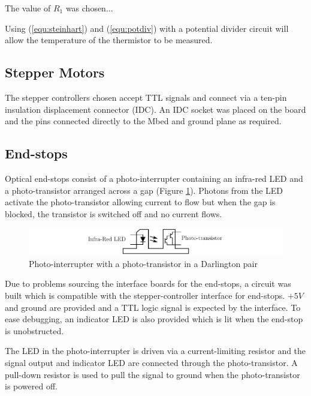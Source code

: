 			
			The value of $R_1$ was chosen...
			
			Using (\ref{equ:steinhart}) and (\ref{equ:potdiv}) with a potential
			divider circuit will allow the temperature of the thermistor to be
			measured.
			
		
		\subsection{Stepper Motors}
			
			The stepper controllers chosen accept TTL signals and connect via a
			ten-pin insulation displacement connector (IDC). An IDC socket was
			placed on the board and the pins connected directly to the Mbed and
			ground plane as required.
			
		
		\subsection{End-stops}
			
			Optical end-stops consist of a photo-interrupter containing an infra-red
			LED and a photo-transistor arranged across a gap (Figure
			\ref{fig:endstop}). Photons from the LED activate the photo-transistor
			allowing current to flow but when the gap is blocked, the transistor is
			switched off and no current flows.
			
			\begin{figure}
				\includegraphics[width=1\textwidth]{diagrams/endstop.pdf}
				\caption{Photo-interrupter with a photo-transistor in a Darlington pair}
				\label{fig:endstop}
			\end{figure}
			
			Due to problems sourcing the interface boards for the end-stops, a
			circuit was built which is compatible with the stepper-controller
			interface for end-stops. $+5V$ and ground are provided and a TTL logic
			signal is expected by the interface. To ease debugging, an indicator LED
			is also provided which is lit when the end-stop is unobstructed.
			
			
			The LED in the photo-interrupter is driven via a current-limiting
			resistor and the signal output and indicator LED are connected through
			the photo-transistor. A pull-down resistor is used to pull the signal
			to ground when the photo-transistor is powered off.
			

